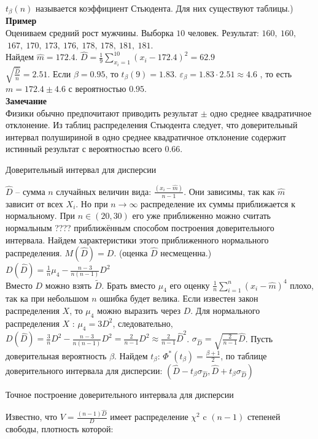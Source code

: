 \documentclass[russian, 12pt, fleqn]{article}
\begin{document}
$t_\beta(n)$ называется коэффициент Стьюдента. Для них существуют таблицы.)\\
\textbf{Пример}\\
Оцениваем средний рост мужчины. Выборка $10$ человек. Результат: $160,\ 160,$\\
 $\ 167,\ 170,\ 173,\ 176,\ 178,\ 178,\ 181,\ 181$.\\
Найдем $\hat{m} = 172.4$. $\hat{D} = \frac{1}{9} \displaystyle{\sum \limits _{x_i = 1}^{10}} (x_i - 172.4)^2 = 62.9$\\
$\sqrt{\frac{\hat{D}}{n}} = 2.51$. Если $\beta = 0.95$, то $t_\beta(9) = 1.83$. $\varepsilon_\beta = 1.83 \cdot 2.51 \approx 4.6$ , то есть $m=172.4 \pm 4.6$ с вероятностью $0.95$.\\
\textbf{Замечание\ } \\
Физики обычно предпочитают приводить результат $\pm$ одно среднее квадратичное отклонение. Из таблиц распределения Стьюдента следует, что доверительный интервал полушириной в одно среднее  квадратичное отклонение содержит истинный результат с вероятностью всего $0.66$.
\begin{center}
$\textbf{Доверительный интервал для дисперсии }$
\end{center}
$\hat{D}$ -- сумма $n$ случайных величин вида: $\frac{(x_i - \hat{m})}{n - 1}$. Они зависимы, так как $\hat{m}$ зависит от всех $X_i$. Но при  $n \rightarrow \infty$ распределение их суммы приближается к нормальному. При $n \in (20, 30)$ его уже приближенно можно считать нормальным ????%
приближённым способом построения доверительного интервала. Найдем характеристики этого приближенного нормального распределения. $M(\hat{D}) = D$. (оценка $\hat{D}$ несмещенна.) $D(\hat{D}) = \frac{1}{n}\mu_4 - \frac{n-3}{n(n-1)}D^2$\\
Вместо $D$ можно взять $\tilde{D}$. Брать вместо $\mu_4$ его оценку $\frac{1}{n}\displaystyle{\sum \limits _{i=1} ^ {n} } (x_i - \hat{m})^4$ плохо, так ка при небольшом $n$ ошибка будет велика. Если известен закон распределения $X$, то $\mu_4$ можно выразить через $D$. Для нормального распределения $X$ : $\mu_4 = 3D^2$, следовательно, $D(\hat{D}) = \frac{3}{n} D^2 - \frac{n - 3}{n(n-1)}D^2 = \frac{2}{n - 1}D^2 \approx \frac{2}{n - 1} \hat{D}^2 $. $\sigma_{\hat{D}} = \sqrt{\frac{2}{n - 1}} \hat{D}$. Пусть доверительная вероятность $\beta$. Найдем $t_{\beta}$: $\Phi^*(t_{\beta}) = \frac{\beta + 1}{2}$, по таблице доверительного интервала для дисперсии: $(\hat{D} - t_\beta \sigma_{\hat{D}}, \hat{D} + t_\beta \sigma_{\hat{D}})$\\
\begin{center}
$\textbf{Точное построение доверительного интервала для дисперсии}$
\end{center}
Известно, что $V = \frac{(n-1)\hat{D}}{D}$ имеет распределение $\chi^2$ c $(n-1)$ степеней свободы, плотность которой:\\
\end{document}
